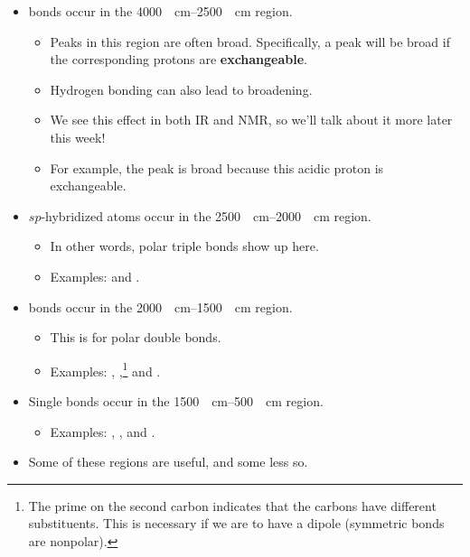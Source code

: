\documentclass[../notes.tex]{subfiles}
\begin{document}
\begin{itemize}
\begin{itemize}
        \begin{itemize}
            \item {} bonds occur in the \SIrange{4000}{2500}{\per\centi\meter} region.
            \begin{itemize}
                \item Peaks in this region are often broad. Specifically, a peak will be broad if the corresponding protons are \textbf{exchangeable}.
                \item Hydrogen bonding can also lead to broadening.
                \item We see this effect in both IR and NMR, so we'll talk about it more later this week!
                \item For example, the  peak is broad because this acidic proton is exchangeable.
            \end{itemize}
            \item $sp$-hybridized atoms occur in the \SIrange{2500}{2000}{\per\centi\meter} region.
            \begin{itemize}
                \item In other words, polar triple bonds show up here.
                \item Examples:  and .
            \end{itemize}
            \item {} bonds occur in the \SIrange{2000}{1500}{\per\centi\meter} region.
            \begin{itemize}
                \item This is for polar double bonds.
                \item Examples: , ,\footnote{The prime on the second carbon indicates that the carbons have different substituents. This is necessary if we are to have a dipole (symmetric  bonds are nonpolar).} and .
            \end{itemize}
            \item Single bonds occur in the \SIrange{1500}{500}{\per\centi\meter} region.
            \begin{itemize}
                \item Examples: , , and .
            \end{itemize}
            \item Some of these regions are useful, and some less so.
        \end{itemize}

\end{itemize}
\end{itemize}
\end{document}
